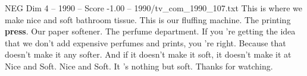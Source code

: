 \begin{textsample}{NEG Dim 4 – 1990 – Score -1.00 – 1990/tv\_com\_1990\_107.txt}  \label{ex:f4_neg_073}
This is where we make nice and soft bathroom tissue.
This is our fluffing machine.
The printing \textbf{press}.
Our paper softener.
The perfume department.
If you 're getting the idea that we don't add expensive perfumes and prints, you 're right.
Because that doesn't make it any softer.
And if it doesn't make it soft, it doesn't make it at Nice and Soft.
Nice and Soft.
It 's nothing but soft.
Thanks for watching.

\end{textsample}
